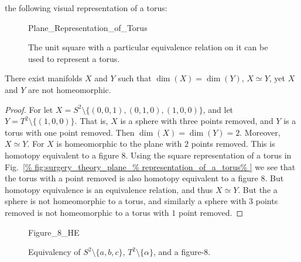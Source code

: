 \documentclass[crop=false,class=book,oneside]{standalone}
\begin{document}
            the following visual representation of a torus:
            \begin{figure}[H]
                \centering
                \captionsetup{type=figure}
                
                          {Plane_Representation_of_Torus}
                \caption[Plane Representation of a Torus]
                        {The unit square with a particular
                         equivalence relation on it can be
                         used to represent a torus.}
                \label{fig:surgery_theory_plane_%
                       representation_of_a_torus}
            \end{figure}
            \begin{theorem}
                There exist manifolds $X$ and $Y$ such that
                $\dim(X)=\dim(Y)$, ${X}\simeq{Y}$,
                yet $X$ and $Y$ are not homeomorphic.
            \end{theorem}
            \begin{proof}
                For let
                $X=S^{2}\setminus\{(0,0,1),(0,1,0),(1,0,0)\}$,
                and let
                $Y=T^{2}\setminus\{(1,0,0)\}$.
                That is, $X$ is a sphere with three points removed,
                and $Y$ is a torus with one point removed. Then
                $\dim(X)=\dim(Y)=2$.
                Moreover, $X\simeq Y$. For $X$ is homeomorphic
                to the plane with $2$ points removed. This is
                homotopy equivalent to a figure $8$.
                Using the square representation of a torus in
                Fig.~\ref{%
                    fig:surgery_theory_plane_%
                    representation_of_a_torus%
                }
                we see that the torus with a point removed
                is also homotopy equivalent to a figure $8$.
                But homotopy equivalence is an equivalence
                relation, and thus $X\simeq Y$. But the a sphere
                is not homeomorphic to a torus, and similarly a
                sphere with $3$ points removed is not homeomorphic
                to a torus with $1$ point removed.
            \end{proof}
            \begin{figure}[H]
                    \centering
                    \captionsetup{type=figure}
                    {Figure_8_HE}
                    \caption{Equivalency of $S^{2}\setminus\{a,b,c\}$,
                             $T^{2}\setminus\{\alpha\}$, and a figure-8.}
                    \label{fig:surgery_theory_homotopy_equivalence_%
                           sphere_with_3_holes_torus_with_1_hole}
            \end{figure} 
\end{document}
